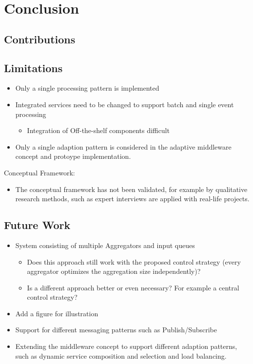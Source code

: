 \chapter{Conclusion}\label{ch:conclusion}

\section{Contributions}

\section{Limitations}

\begin{itemize}
	\item Only a single processing pattern is implemented
	\item Integrated services need to be changed to support batch and single event processing
	\begin{itemize}
		\item Integration of Off-the-shelf components difficult
	\end{itemize}
	\item Only a single adaption pattern is considered in the adaptive middleware concept and protoype implementation.
\end{itemize}

Conceptual Framework:
\begin{itemize}
	\item The conceptual framework has not been validated, for example by qualitative research methods, such as expert interviews are applied with real-life projects.
\end{itemize}

\section{Future Work}

\begin{itemize}
	\item System consisting of multiple Aggregators and input queues
	\begin{itemize}
		\item Does this approach still work with the proposed control strategy (every aggregator optimizes the aggregation size independently)?
		\item Is a different approach better or even necessary? For example a central control strategy?
	\end{itemize}
	\item Add a figure for illustration
	\item Support for different messaging patterns such as Publish/Subscribe
	\item Extending the middleware concept to support different adaption patterns, such as dynamic service composition and selection and load balancing.
\end{itemize}